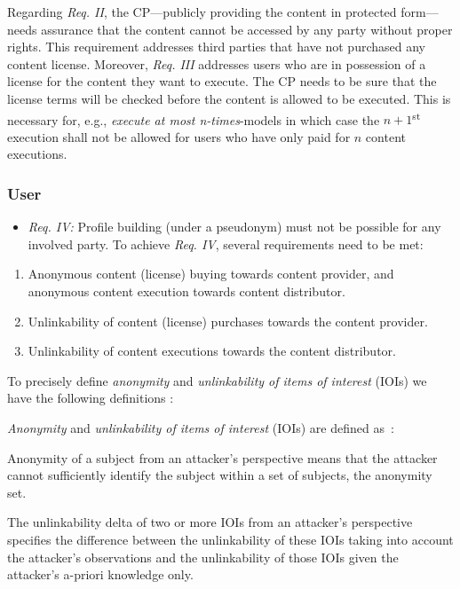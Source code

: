 \documentclass{llncs}
\begin{document}
Regarding \emph{Req. II}, the CP---publicly providing the content in protected form---needs assurance that the content cannot be accessed by any party without proper rights. This requirement addresses third parties that have not purchased any content license. Moreover, \emph{Req. III} addresses users who are in possession of a license for the content they want to execute. The CP needs to be sure that the license terms will be checked before the content is allowed to be executed. This is necessary for, e.g., \emph{execute at most n-times}-models in which case the $n+1$\textsuperscript{st} execution shall not be allowed for users who have only paid for $n$ content executions.


\subsubsection{User}

\begin{itemize}
\item \emph{Req. IV:} Profile building (under a pseudonym) must not be possible for any involved party. To achieve \emph{Req. IV}, several requirements need to be met:
\end{itemize}


\begin{enumerate}
\item Anonymous content (license) buying towards content provider, and anonymous content execution towards content distributor. 
\item Unlinkability of content (license) purchases towards the content provider. \item Unlinkability of content executions towards the content distributor. \end{enumerate}


To precisely define \emph{anonymity} and \emph{unlinkability of items of interest} (IOIs) we have the following definitions \cite{unlinkability}:

\emph{Anonymity} and \emph{unlinkability of items of interest} (IOIs) are defined as~\cite{unlinkability}:

\begin{definition}[Anonymity]
Anonymity of a subject from an attacker's perspective means that the attacker cannot sufficiently identify the subject within a set of subjects, the anonymity set.
\end{definition}

\begin{definition}
The unlinkability delta of two or more IOIs from an attacker's perspective specifies the difference between the unlinkability of these IOIs taking into account the attacker's observations and the unlinkability of those IOIs given the attacker's a-priori knowledge only.
\end{definition}
\end{document}
